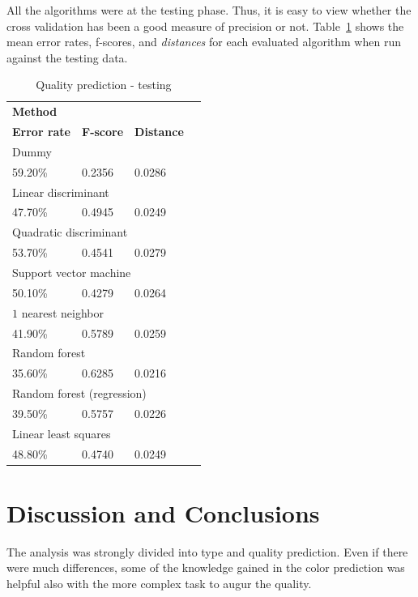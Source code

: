 \documentclass[twoside]{article}
\begin{document}
\begin{multicols}{2}
All the algorithms were at the testing phase. Thus, it is easy to view whether the cross validation has been a good measure of precision or not.
Table~\ref{table:quality_testing} shows the mean error rates, f-scores, and \emph{distances} for each evaluated algorithm when run against the testing data.

\begin{table}[H]
\caption{Quality prediction - testing}
\label{table:quality_testing}
\centering
\begin{tabular}{llll}
\multicolumn{3}{l}{\textbf{Method}} \\
\textbf{Error rate} & \textbf{F-score} & \textbf{Distance} \\
\midrule
\multicolumn{3}{l}{Dummy} \\
59.20\% & 0.2356 & 0.0286 \\
\multicolumn{3}{l}{Linear discriminant} \\
47.70\% & 0.4945 & 0.0249 \\
\multicolumn{3}{l}{Quadratic discriminant} \\
53.70\% & 0.4541 & 0.0279 \\
\multicolumn{3}{l}{Support vector machine} \\
50.10\% & 0.4279 & 0.0264 \\
\multicolumn{3}{l}{$1$ nearest neighbor} \\
41.90\% & 0.5789 & 0.0259 \\
\multicolumn{3}{l}{Random forest} \\
35.60\% & 0.6285 & 0.0216 \\
\multicolumn{3}{l}{Random forest (regression)} \\
39.50\% & 0.5757 & 0.0226 \\
\multicolumn{3}{l}{Linear least squares} \\
48.80\% & 0.4740 & 0.0249 \\
\end{tabular}
\end{table}


\section{Discussion and Conclusions}

The analysis was strongly divided into type and quality prediction.
Even if there were much differences, some of the knowledge gained in the color prediction
was helpful also with the more complex task to augur the quality.


\end{multicols}
\end{document}
